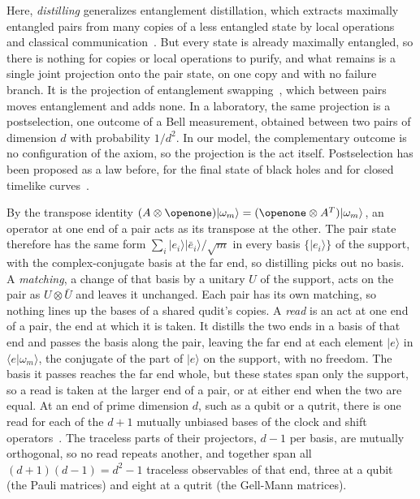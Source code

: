 \documentclass[aps,prl,reprint,superscriptaddress,longbibliography,nofootinbib,floatfix]{revtex4-2}
\theoremstyle{definition}
\newcommand{\ket}[1]{|#1\rangle}
\newcommand{\bra}[1]{\langle#1|}
\begin{document}
Here, \emph{distilling} generalizes entanglement distillation, which extracts maximally entangled pairs from many copies of a less entangled state by local operations and classical communication~\cite{bennett1996a,bennett1996b}. But every state is already maximally entangled, so there is nothing for copies or local operations to purify, and what remains is a single joint projection onto the pair state, on one copy and with no failure branch. It is the projection of entanglement swapping~\cite{zukowski1993}, which between pairs moves entanglement and adds none. In a laboratory, the same projection is a postselection, one outcome of a Bell measurement, obtained between two pairs of dimension $d$ with probability $1/d^{2}$. In our model, the complementary outcome is no configuration of the axiom, so the projection is the act itself. Postselection has been proposed as a law before, for the final state of black holes and for closed timelike curves~\cite{horowitz2004,lloyd2011}.

By the transpose identity $(A\otimes\openone)\ket{\omega_{m}}=(\openone\otimes A^{T})\ket{\omega_{m}}$, an operator at one end of a pair acts as its transpose at the other. The pair state therefore has the same form $\sum_{i}\ket{e_{i}}\ket{\bar{e}_{i}}/\sqrt{m}$ in every basis $\{\ket{e_{i}}\}$ of the support, with the complex-conjugate basis at the far end, so distilling picks out no basis. A \emph{matching}, a change of that basis by a unitary $U$ of the support, acts on the pair as $U\otimes\bar{U}$ and leaves it unchanged. Each pair has its own matching, so nothing lines up the bases of a shared qudit's copies. A \emph{read} is an act at one end of a pair, the end at which it is taken. It distills the two ends in a basis of that end and passes the basis along the pair, leaving the far end at each element $\ket{e}$ in $\bra{e}\omega_{m}\rangle$, the conjugate of the part of $\ket{e}$ on the support, with no freedom. The basis it passes reaches the far end whole, but these states span only the support, so a read is taken at the larger end of a pair, or at either end when the two are equal. At an end of prime dimension $d$, such as a qubit or a qutrit, there is one read for each of the $d+1$ mutually unbiased bases of the clock and shift operators~\cite{wootters1989}. The traceless parts of their projectors, $d-1$ per basis, are mutually orthogonal, so no read repeats another, and together span all \mbox{$(d+1)(d-1)=d^{2}-1$} traceless observables of that end, three at a qubit (the Pauli matrices) and eight at a qutrit (the Gell-Mann matrices).
\end{document}
